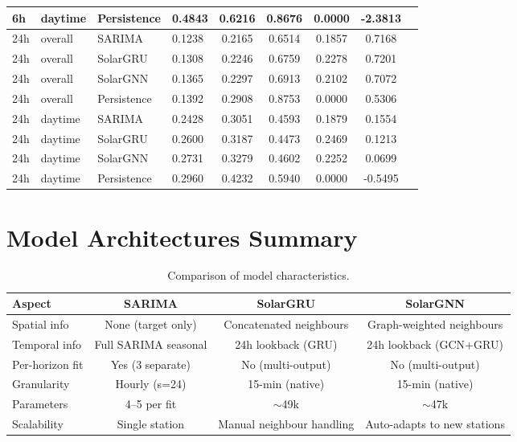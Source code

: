 \documentclass[11pt,a4paper]{article}
\begin{document}
\begin{table}[H]
\begin{tabular}{llllccccc}
6h & daytime & Persistence & 0.4843 & 0.6216 & 0.8676 & 0.0000 & -2.3813 \\
\midrule
24h & overall & SARIMA & 0.1238 & 0.2165 & 0.6514 & 0.1857 & 0.7168 \\
24h & overall & SolarGRU & 0.1308 & 0.2246 & 0.6759 & 0.2278 & 0.7201 \\
24h & overall & SolarGNN & 0.1365 & 0.2297 & 0.6913 & 0.2102 & 0.7072 \\
24h & overall & Persistence & 0.1392 & 0.2908 & 0.8753 & 0.0000 & 0.5306 \\
24h & daytime & SARIMA & 0.2428 & 0.3051 & 0.4593 & 0.1879 & 0.1554 \\
24h & daytime & SolarGRU & 0.2600 & 0.3187 & 0.4473 & 0.2469 & 0.1213 \\
24h & daytime & SolarGNN & 0.2731 & 0.3279 & 0.4602 & 0.2252 & 0.0699 \\
24h & daytime & Persistence & 0.2960 & 0.4232 & 0.5940 & 0.0000 & -0.5495 \\
\bottomrule
\end{tabular}
\end{table}

\section{Model Architectures Summary}
\label{app:architecture}

\begin{table}[H]
\centering
\caption{Comparison of model characteristics.}
\label{tab:model_comparison}
\begin{tabular}{lccc}
\toprule
\textbf{Aspect} & \textbf{SARIMA} & \textbf{SolarGRU} & \textbf{SolarGNN} \\
\midrule
Spatial info & None (target only) & Concatenated neighbours & Graph-weighted neighbours \\
Temporal info & Full SARIMA seasonal & 24h lookback (GRU) & 24h lookback (GCN+GRU) \\
Per-horizon fit & Yes (3 separate) & No (multi-output) & No (multi-output) \\
Granularity & Hourly (s=24) & 15-min (native) & 15-min (native) \\
Parameters & 4--5 per fit & $\sim$49k & $\sim$47k \\
Scalability & Single station & Manual neighbour handling & Auto-adapts to new stations \\
\bottomrule
\end{tabular}
\end{table}
\end{document}
